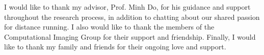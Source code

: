 I would like to thank my advisor, Prof. Minh Do, for his guidance and support
throughout the research process, in addition to chatting about our shared
passion for distance running. I also would like to thank the members of the
Computational Imaging Group for their support and friendship. Finally, I would
like to thank my family and friends for their ongoing love and support.
